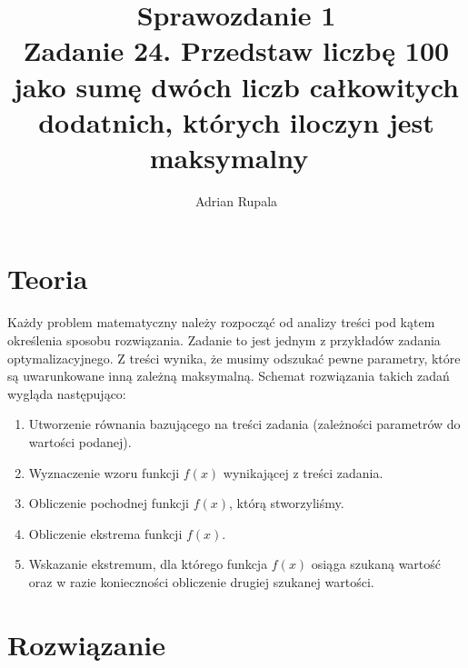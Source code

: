 \documentclass[UTF8]{article}
\title{%
	Sprawozdanie 1 \\
	\large Zadanie 24. Przedstaw liczbę 100 jako sumę dwóch liczb całkowitych dodatnich, których iloczyn jest maksymalny~}
\author{Adrian Rupala}
\begin{document}
\maketitle

\newpage
\tableofcontents

\newpage
{}

\section{Teoria}

Każdy problem matematyczny należy rozpocząć od analizy treści pod kątem określenia sposobu rozwiązania. Zadanie to jest jednym z przykładów zadania optymalizacyjnego. Z treści wynika, że musimy odszukać pewne parametry, które są uwarunkowane inną zależną maksymalną. Schemat rozwiązania takich zadań wygląda następująco: ~

\begin{enumerate}
	\item Utworzenie równania bazującego na treści zadania (zależności parametrów do wartości podanej).
	\item Wyznaczenie wzoru funkcji $f(x)$ wynikającej z treści zadania. ~
	\item Obliczenie pochodnej funkcji $f(x)$,  którą stworzyliśmy. ~
	\item Obliczenie ekstrema funkcji $f(x)$. ~
	\item Wskazanie ekstremum, dla którego funkcja $f(x)$ osiąga szukaną wartość oraz w razie konieczności obliczenie drugiej szukanej wartości. ~
\end{enumerate}

\section{Rozwiązanie}
\end{document}
